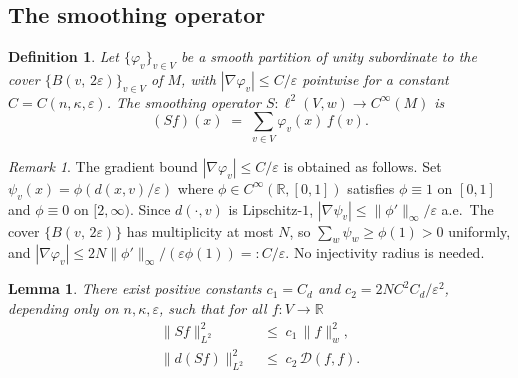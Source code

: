 \documentclass[10pt,reqno]{amsart}
\newtheorem{lemma}[theorem]{Lemma}
\newtheorem{definition}[theorem]{Definition}
\theoremstyle{remark}
\newtheorem{remark}[theorem]{Remark}
\newcommand{\R}{\mathbb{R}}
\newcommand{\normw}[1]{\lVert #1 \rVert_{w}}
\newcommand{\norml}[1]{\lVert #1 \rVert_{L^{2}}}
\newcommand{\DD}{\mathcal{D}}
\newcommand{\B}[2]{B(#1,\,#2)}
\begin{document}
\subsection{The smoothing operator}

\begin{definition}
\label{def:smooth}
Let $\{\varphi_v\}_{v\in V}$ be a smooth partition of unity subordinate
to the cover $\{\B{v}{2\varepsilon}\}_{v\in V}$ of $M$, with
$|\nabla\varphi_v|\leq C/\varepsilon$ pointwise for a constant
$C=C(n,\kappa,\varepsilon)$.
The \emph{smoothing operator} $S:\ell^2(V,w)\to C^\infty(M)$ is
\[
  (Sf)(x) \;=\; \sum_{v\in V}\varphi_v(x)\,f(v).
\]
\end{definition}

\begin{remark}
\label{rem:gradphi}
The gradient bound $|\nabla\varphi_v|\leq C/\varepsilon$ is obtained as
follows. Set $\psi_v(x)=\phi(d(x,v)/\varepsilon)$ where
$\phi\in C^\infty(\R,[0,1])$ satisfies $\phi\equiv 1$ on $[0,1]$ and
$\phi\equiv 0$ on $[2,\infty)$. Since $d(\cdot,v)$ is Lipschitz-$1$,
$|\nabla\psi_v|\leq\|\phi'\|_\infty/\varepsilon$ a.e.\
The cover $\{\B{v}{2\varepsilon}\}$ has multiplicity at most $N$, so
$\sum_w\psi_w\geq\phi(1)>0$ uniformly, and
$|\nabla\varphi_v|\leq 2N\|\phi'\|_\infty/(\varepsilon\phi(1))=:C/\varepsilon$.
No injectivity radius is needed.
\end{remark}

\begin{lemma}
\label{lem:smooth}
There exist positive constants $c_1=C_d$ and
$c_2 = 2NC^2C_d/\varepsilon^2$,
depending only on $n,\kappa,\varepsilon$, such that for all $f:V\to\R$
\begin{align}
  \norml{Sf}^2 &\;\leq\; c_1\,\normw{f}^2,
  \label{eq:L2S}\\
  \norml{d(Sf)}^2 &\;\leq\; c_2\,\DD(f,f).
  \label{eq:GradS}
\end{align}
\end{lemma}
\end{document}
